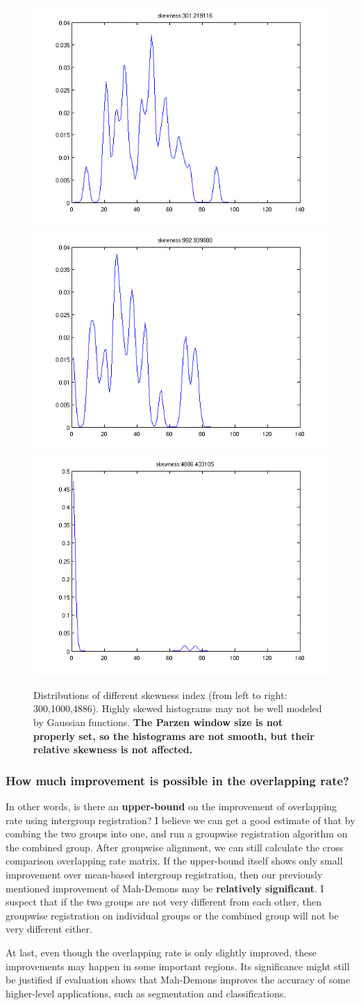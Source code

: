 \documentclass[preprint,review,12pt]{elsarticle}
\begin{document}
\begin{figure}[h!!!!!!!!!!!!tb]
\begin{center}
	\includegraphics[width=.3\linewidth]{figs/skewed_300.png}
	\includegraphics[width=.3\linewidth]{figs/skewed_1000.png}
	\includegraphics[width=.3\linewidth]{figs/skewed_4886.png}
\end{center}
\caption{Distributions of different skewness index (from left to right: 300,1000,4886). Highly skewed histograms may not be well modeled by Gaussian functions. {\bf The Parzen window size is not properly set, so the histograms are not smooth, but their relative skewness is not affected. }}
\label{fig:skewness_index}
\end{figure}

\subsubsection{How much improvement is possible in the overlapping rate?}
In other words, is there an {\bf upper-bound} on the improvement of overlapping rate using intergroup registration? I believe we can get a good estimate of that by combing the two groups into one, and run a groupwise registration algorithm on the combined group. After groupwise alignment, we can still calculate the cross comparison overlapping rate matrix. If the upper-bound itself shows only small improvement over mean-based intergroup registration, then our previously mentioned  improvement of Mah-Demons may be {\bf relatively significant}.
I suspect that if the two groups are not very different from each other, then groupwise registration on individual groups or the combined group will not be very different either. 

At last, even though the overlapping rate is only slightly improved, these improvements may happen in some important regions. Its significance might still be justified if evaluation shows that Mah-Demons improves the accuracy of some higher-level applications, such as segmentation and classifications.

\FloatBarrier

{\small 


}
\end{document}
